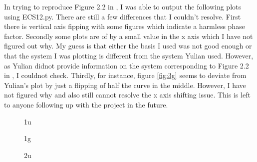 \documentclass [11pt,a4paper]{report}
\begin{document}
In trying to reproduce Figure 2.2 in \cite{YulianThesis}, I was able to output the following plots using ECS12.py. There are still a few differences that I couldn't resolve. First there is vertical axis fipping with some figures which indicate a harmless phase factor. Secondly some plots are of by a small value in the x axis which I have not figured out why. My guess is that either the basis I used was not good enough or that the system I was plotting is different from the system Yulian used. However, as Yulian didnot provide information on the system corresponding to Figure 2.2 in \cite{YulianThesis}, I couldnot check. Thirdly, for instance, figure \ref{fig:3g} seems to deviate from Yulian's plot by just a flipping of half the curve in the middle. However, I have not figured why and also still cannot resolve the x axis shifting issue. This is left to anyone following up with the project in the future.

\begin{figure}[H]
  \centering
  \hfill
  \caption{1u}
  \label{fig:1u}
\end{figure}

\begin{figure}[H]
    \centering
    \hfill
    \caption{1g}
    \label{fig:1g}
\end{figure}

\begin{figure}[H]
    \centering
    \hfill
    \caption{2u}
    \label{fig:2u}
\end{figure}
\end{document}
